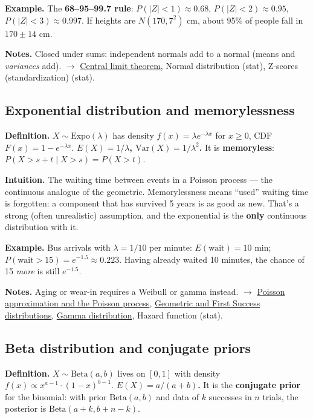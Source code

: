 \documentclass[11pt,a4paper]{article}
\begin{document}
\textbf{Example.} The \textbf{68--95--99.7 rule}: $P(|Z| < 1) \approx  0.68$, $P(|Z| < 2) \approx  0.95$, $P(|Z| < 3) \approx  0.997$. If heights are $N(170, 7^{2})$ cm, about 95\% of people fall in $170 \pm  14$ cm.

\textbf{Notes.} Closed under sums: independent normals add to a normal (means and \textit{variances} add). $\to$ \hyperref[sec:central-limit-theorem]{Central limit theorem}, Normal distribution (stat), Z-scores (standardization) (stat).

\subsection{Exponential distribution and memorylessness}\label{sec:exponential-distribution-and-memorylessness}

\textbf{Definition.} $X \sim \mathrm{Expo}(\lambda )$ has density $f(x) = \lambda e^{-\lambda x}$ for $x \geq  0$, CDF $F(x) = 1 - e^{-\lambda x}$. \textbf{$E(X) = 1/\lambda$, $\mathrm{Var}(X) = 1/\lambda ^{2}$.} It is \textbf{memoryless}: $P(X > s + t \mid X > s) = P(X > t)$.

\textbf{Intuition.} The waiting time between events in a Poisson process --- the continuous analogue of the geometric. Memorylessness means ``used'' waiting time is forgotten: a component that has survived 5 years is as good as new. That's a strong (often unrealistic) assumption, and the exponential is the \textbf{only} continuous distribution with it.

\textbf{Example.} Bus arrivals with $\lambda  = 1/10$ per minute: $E(\text{wait}) = 10$ min; $P(\text{wait} > 15) = e^{-1.5} \approx  0.223$. Having already waited 10 minutes, the chance of 15 \textit{more} is still $e^{-1.5}$.

\textbf{Notes.} Aging or wear-in requires a Weibull or gamma instead. $\to$ \hyperref[sec:poisson-approximation-and-the-poisson-process]{Poisson approximation and the Poisson process}, \hyperref[sec:geometric-and-first-success-distributions]{Geometric and First Success distributions}, \hyperref[sec:gamma-distribution]{Gamma distribution}, Hazard function (stat).

\subsection{Beta distribution and conjugate priors}\label{sec:beta-distribution-and-conjugate-priors}

\textbf{Definition.} $X \sim \mathrm{Beta}(a, b)$ lives on $[0,1]$ with density $f(x) \propto  x^{a-1}\cdot (1-x)^{b-1}$. \textbf{$E(X) = a/(a+b)$.} It is the \textbf{conjugate prior} for the binomial: with prior $\mathrm{Beta}(a,b)$ and data of $k$ successes in $n$ trials, the posterior is $\mathrm{Beta}(a + k, b + n - k)$.
\end{document}

